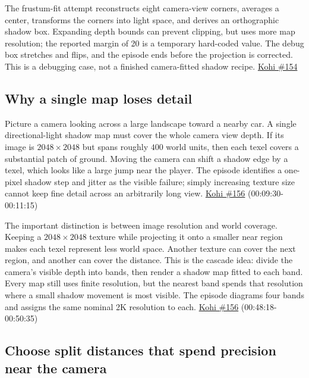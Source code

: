 The frustum-fit attempt reconstructs eight camera-view corners, averages a center, transforms the corners into light space, and derives an orthographic shadow box. Expanding depth bounds can prevent clipping, but uses more map resolution; the reported margin of 20 is a temporary hard-coded value. The debug box stretches and flips, and the episode ends before the projection is corrected. This is a debugging case, not a finished camera-fitted shadow recipe. \href{https://www.youtube.com/watch?v=GfpDnw66Ue8}{Kohi \#154}

\subsection{Why a single map loses detail}\label{06-engine-ii-ch026-why-a-single-map-loses-detail}

Picture a camera looking across a large landscape toward a nearby car. A single directional-light shadow map must cover the whole camera view depth. If its image is \(2048\times2048\) but spans roughly \(400\) world units, then each texel covers a substantial patch of ground. Moving the camera can shift a shadow edge by a texel, which looks like a large jump near the player. The episode identifies a one-pixel shadow step and jitter as the visible failure; simply increasing texture size cannot keep fine detail across an arbitrarily long view. \href{https://www.youtube.com/watch?v=coWS_saBPBk}{Kohi \#156} (00:09:30-00:11:15)

The important distinction is between image resolution and world coverage. Keeping a \(2048\times2048\) texture while projecting it onto a smaller near region makes each texel represent less world space. Another texture can cover the next region, and another can cover the distance. This is the cascade idea: divide the camera's visible depth into bands, then render a shadow map fitted to each band. Every map still uses finite resolution, but the nearest band spends that resolution where a small shadow movement is most visible. The episode diagrams four bands and assigns the same nominal 2K resolution to each. \href{https://www.youtube.com/watch?v=coWS_saBPBk}{Kohi \#156} (00:48:18-00:50:35)

\subsection{Choose split distances that spend precision near the camera}\label{06-engine-ii-ch026-choose-split-distances-that-spend-precision-near-the-camera}

